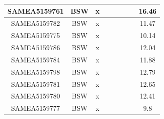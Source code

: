 \documentclass[../main.tex]{subfiles}
\begin{document}
\begin{flushleft}
\begin{footnotesize}
\begin{longtable}{|c|c|c|c|c|c|c|}
    \hline
    SAMEA5159761  & BSW   & x                                                            & ~          & ~                                                                           & ~                                                                 & 16.46     \\ 
    \hline
    SAMEA5159782  & BSW   & x                                                            & ~          & ~                                                                           & ~                                                                 & 11.47     \\ 
    \hline
    SAMEA5159775  & BSW   & x                                                            & ~          & ~                                                                           & ~                                                                 & 10.14     \\ 
    \hline
    SAMEA5159786  & BSW   & x                                                            & ~          & ~                                                                           & ~                                                                 & 12.04     \\ 
    \hline
    SAMEA5159784  & BSW   & x                                                            & ~          & ~                                                                           & ~                                                                 & 11.88     \\ 
    \hline
    SAMEA5159798  & BSW   & x                                                            & ~          & ~                                                                           & ~                                                                 & 12.79     \\ 
    \hline
    SAMEA5159781  & BSW   & x                                                            & ~          & ~                                                                           & ~                                                                 & 12.65     \\ 
    \hline
    SAMEA5159780  & BSW   & x                                                            & ~          & ~                                                                           & ~                                                                 & 12.41     \\ 
    \hline
    SAMEA5159777  & BSW   & x                                                            & ~          & ~                                                                           & ~                                                                 & 9.8       \\ 

\end{longtable}
\end{footnotesize}
\end{flushleft}
\end{document}
